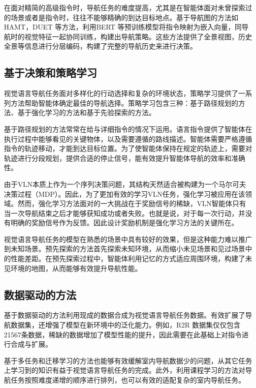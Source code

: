 \documentclass[bachelor]{thesis-uestc}
\begin{document}
   在面对精简的高级指令时，导航任务的难度提高，尤其是在智能体面对未曾探索过的场景或者是指令时，往往不能够精确的到达目标地点。基于导航图的方法如HAMT\cite{chen2021history}，DUET\cite{chenThinkGlobalAct2022} 等方法，利用BERT\cite{devlinBERTPretrainingDeep2019} 等预训练模型将指令映射为嵌入向量，同导航时的视觉特征一起协同训练，构建出导航策略。这些方法提供了全景视图，历史全景等信息进行分层编码，构建了完整的导航历史来进行决策。

\subsection{基于决策和策略学习}
   视觉语言导航任务面对多样化的行动选择和复杂的环境状态，策略学习提供了一系列方法帮助智能体确定最佳的导航选择。策略学习包含三种：基于路径规划的方法、基于强化学习的方法和基于先验探索的方法。

   基于路径规划的方法常常在给与详细指令的情况下运用。语言指令提供了智能体在执行过程中能够看见的关键物体，以及需要遵循的路线描述。智能体需要严格遵循指令的轨迹移动，才能到达目标位置。为了使智能体保持在规定的轨迹上，需要对轨迹进行分段规划，提供合适的停止信号，能有效提升智能体导航的效率和准确性。

   由于VLN本质上作为一个序列决策问题，其结构天然适合被构建为一个马尔可夫决策过程（MDP）。因此，为了更加有效的学习VLN任务，强化学习被应用在该领域。然而，强化学习方法面对的一大挑战在于奖励信号的稀缺，VLN智能体只有当一次导航结束之后才能够获知成功或者失败。也就是说，对于每一次行动，并没有明确的奖励信号作为反馈。因此设计奖励机制是强化学习方法的关键所在。

   视觉语言导航任务的模型在熟悉的场景中具有较好的效果，但是这种能力难以推广到未知场景。预先探索的方法首先探索未知环境，从而缩小未见场景和见过场景中的性能差距。在预先探索过程中，智能体利用记忆的方式适应周围环境，构建了未见环境的地图，从而能够有效提升导航性能。

\subsection{数据驱动的方法}
   基于数据驱动的方法利用现成的数据合成为视觉语言导航任务数据。有效扩展了导航数据集，还增强了模型在新环境中的泛化能力。例如，R2R 数据集仅仅包含21567条数据，稀缺的数据增加了模型性能的提升，因此需要在此基础上对指令进行合成与扩展。

   基于多任务和迁移学习的方法也能够有效缓解室内导航数据少的问题，从其它任务上学习到的知识有益于视觉语言导航任务的完成。此外，利用课程学习的方法对导航任务按照难度递增的顺序进行排列，也可以有效的适配复杂的室内导航任务。
\end{document}
